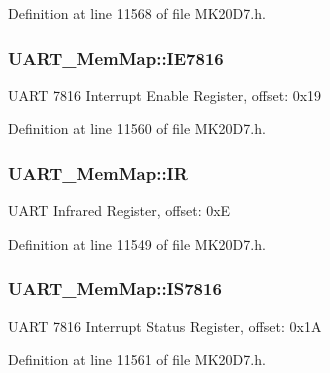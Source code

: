 Definition at line 11568 of file M\+K20\+D7.\+h.

\subsubsection[{\texorpdfstring{I\+E7816}{IE7816}}]{ U\+A\+R\+T\+\_\+\+Mem\+Map\+::\+I\+E7816}\hypertarget{struct_u_a_r_t___mem_map_ac017c0660f75109edd9cc250a1ddfb5a}{}\label{struct_u_a_r_t___mem_map_ac017c0660f75109edd9cc250a1ddfb5a}
U\+A\+RT 7816 Interrupt Enable Register, offset\+: 0x19 

Definition at line 11560 of file M\+K20\+D7.\+h.

\subsubsection[{\texorpdfstring{IR}{IR}}]{ U\+A\+R\+T\+\_\+\+Mem\+Map\+::\+IR}\hypertarget{struct_u_a_r_t___mem_map_a8d1433df262b6816268f338d0c8e7d57}{}\label{struct_u_a_r_t___mem_map_a8d1433df262b6816268f338d0c8e7d57}
U\+A\+RT Infrared Register, offset\+: 0xE 

Definition at line 11549 of file M\+K20\+D7.\+h.

\subsubsection[{\texorpdfstring{I\+S7816}{IS7816}}]{ U\+A\+R\+T\+\_\+\+Mem\+Map\+::\+I\+S7816}\hypertarget{struct_u_a_r_t___mem_map_a322fd75b8e5c882ec48c6e065aade707}{}\label{struct_u_a_r_t___mem_map_a322fd75b8e5c882ec48c6e065aade707}
U\+A\+RT 7816 Interrupt Status Register, offset\+: 0x1A 

Definition at line 11561 of file M\+K20\+D7.\+h.

